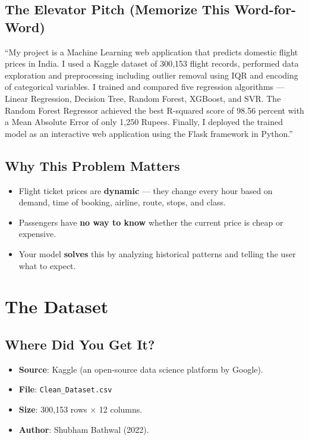\documentclass[12pt, a4paper]{article}
\begin{document}
\subsection{The Elevator Pitch (Memorize This Word-for-Word)}

\begin{tipbox}
    ``My project is a Machine Learning web application that predicts domestic flight prices in India. I used a Kaggle dataset of 300,153 flight records, performed data exploration and preprocessing including outlier removal using IQR and encoding of categorical variables. I trained and compared five regression algorithms — Linear Regression, Decision Tree, Random Forest, XGBoost, and SVR. The Random Forest Regressor achieved the best R-squared score of 98.56 percent with a Mean Absolute Error of only 1,250 Rupees. Finally, I deployed the trained model as an interactive web application using the Flask framework in Python.''
\end{tipbox}

\subsection{Why This Problem Matters}
\begin{itemize}
    \item Flight ticket prices are \textbf{dynamic} — they change every hour based on demand, time of booking, airline, route, stops, and class.
    \item Passengers have \textbf{no way to know} whether the current price is cheap or expensive.
    \item Your model \textbf{solves} this by analyzing historical patterns and telling the user what to expect.
\end{itemize}


\section{The Dataset}

\subsection{Where Did You Get It?}
\begin{itemize}
    \item \textbf{Source}: Kaggle (an open-source data science platform by Google).
    \item \textbf{File}: \texttt{Clean\_Dataset.csv}
    \item \textbf{Size}: 300,153 rows $\times$ 12 columns.
    \item \textbf{Author}: Shubham Bathwal (2022).
\end{itemize}
\end{document}
